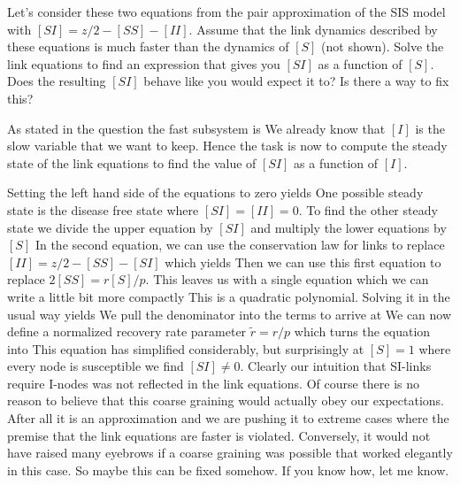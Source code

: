 Let's consider these two equations from the pair approximation of the SIS model 
with $[SI]=z/2-[SS]-[II]$. Assume that the link dynamics described by these equations is much faster than the dynamics of $[S]$ (not shown). Solve the link equations to find an expression that gives you $[SI]$ as a function of $[S]$. 
Does the resulting $[SI]$ behave like you would expect it to? Is there a way to fix this?

\solution
As stated in the question the fast subsystem is 
We already know that $[I]$ is the slow variable that we want to keep. Hence the task is now to compute the steady state of the link equations to find the value of $[SI]$ as a function of $[I]$.  

Setting the left hand side of the equations to zero yields 
One possible steady state is the disease free state where $[SI]=[II]=0$. To find the other steady state we divide the upper equation by $[SI]$ and multiply the lower equations by $[S]$
In the second equation, we can use the conservation law for links to replace $[II]=z/2-[SS]-[SI]$ which yields 
Then we can use this first equation to replace $2[SS]=r[S]/p$. This leaves us with a single equation 
which we can write a little bit more compactly 
This is a quadratic polynomial. Solving it in the usual way yields 
We pull the denominator into the terms to arrive at 
We can now define a normalized recovery rate parameter $\tilde{r}=r/p$ which turns the equation into 
This equation has simplified considerably, but surprisingly at $[S]=1$ where every node is susceptible we find $[SI]\neq 0$. Clearly our intuition that SI-links require I-nodes was not reflected in the link equations. Of course there is no reason to believe that this coarse graining would actually obey our expectations. After all it is an approximation and we are pushing it to extreme cases where the premise that the link equations are faster is violated. Conversely, it would not have raised many eyebrows if a coarse graining was possible that worked elegantly in this case. So maybe this can be fixed somehow. If you know how, let me know. 
